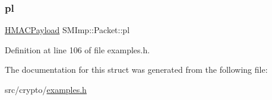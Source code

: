 \mbox{\label{structSMImp_1_1Packet_a67ec508fa97565dc38e45153b0211e89}} 
\subsubsection{\texorpdfstring{pl}{pl}}
{\footnotesize\ttfamily \hyperlink{structSMImp_1_1HMACPayload}{H\+M\+A\+C\+Payload} S\+M\+Imp\+::\+Packet\+::pl}



Definition at line 106 of file examples.\+h.



The documentation for this struct was generated from the following file\+:\begin{DoxyCompactItemize}
\item 
src/crypto/\hyperlink{examples_8h}{examples.\+h}\end{DoxyCompactItemize}
